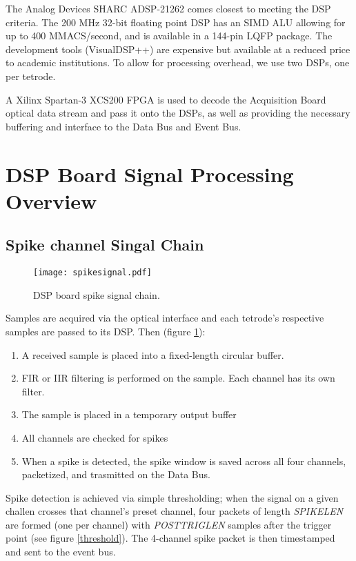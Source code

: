  The Analog Devices SHARC ADSP-21262 comes closest to meeting
the DSP criteria. The 200 MHz 32-bit floating point DSP has an SIMD
ALU allowing for up to 400 MMACS/second, and is available in a 144-pin
LQFP package. The development tools (VisualDSP++) are expensive but
available at a reduced price to academic institutions. To allow for
processing overhead, we use two DSPs, one per tetrode.  
      
A Xilinx Spartan-3 XCS200 FPGA is used to decode the Acquisition Board
optical data stream and pass it onto the DSPs, as well as providing
the necessary buffering and interface to the Data Bus and Event Bus.
      

\section{DSP Board Signal Processing Overview}

\subsection{Spike channel Singal Chain}
\begin{figure}[h!]
\begin{center}
\texttt{[image: spikesignal.pdf]}
\end{center}
\label{SpikeChain}
\caption{DSP board spike signal chain.}
\end{figure}

Samples are acquired via the optical interface and each tetrode's respective samples are passed to its DSP. Then (figure \ref{SpikeChain}): 

\begin{enumerate}
\item A received sample is placed into a fixed-length circular buffer. 
\item FIR or IIR filtering is performed on the sample. Each channel has its own filter. 
\item The sample is placed in a temporary output buffer
\item All channels are checked for spikes
\item When a spike is detected, the spike window is saved across all four channels, packetized, and trasmitted on the Data Bus. 
\end{enumerate}


Spike detection is achieved via simple thresholding; when the signal on a given challen crosses that channel's preset channel, four packets of length \textit{SPIKELEN} are formed (one per channel) with \textit{POSTTRIGLEN} samples after the trigger point (see figure \ref{threshold}). The 4-channel spike packet is then timestamped and sent to the event bus. 


